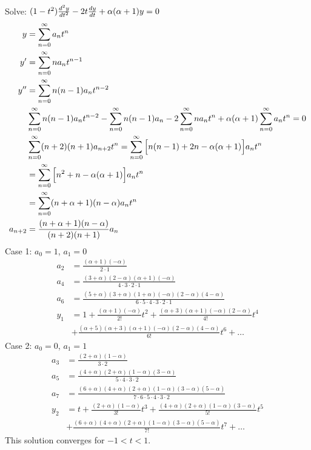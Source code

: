 \documentclass[12pt]{article}
\begin{document}
\begin{example} Solve: $(1 - t^2)\frac{d^2y}{dt^2} - 2t\frac{dy}{dt} + \alpha(\alpha + 1)y = 0 $ $$\begin{aligned} y &= \sum_{n = 0}^{\infty} a_nt^n \\ y' &= \sum_{n = 0}^{\infty} na_nt^{n - 1} \\ y'' &= \sum_{n = 0}^{\infty} n(n - 1)a_nt^{n - 2} \\ &\sum_{n = 0}^{\infty} n(n - 1)a_nt^{n - 2} - \sum_{n = 0}^{\infty} n(n - 1)a_n - 2\sum_{n = 0}^{\infty} na_nt^n + \alpha(\alpha + 1)\sum_{n = 0}^{\infty} a_nt^n = 0 \\ &\sum_{n = 0}^{\infty} (n + 2)(n + 1)a_{n + 2}t^n = \sum_{n = 0}^{\infty} \Big[ n(n - 1) + 2n - \alpha(\alpha + 1)\Big] a_nt^n \\ &= \sum_{n = 0}^{\infty} \Big[ n^2 + n - \alpha(\alpha + 1)\Big] a_nt^n \\ &= \sum_{n = 0}^{\infty} (n + \alpha + 1)(n - \alpha) a_nt^n \\ a_{n + 2} &= \frac{(n + \alpha + 1)(n - \alpha)}{(n + 2)(n  +1)}a_n \end{aligned} $$ Case 1: $a_0 = 1$, $a_1 = 0$ $$\begin{aligned} a_2 &= \frac{(\alpha + 1)(-\alpha)}{2 \cdot 1} \\ a_4 &= \frac{(3 + \alpha)(2 - \alpha)(\alpha + 1)(-\alpha)}{4 \cdot 3 \cdot 2 \cdot 1} \\ a_6 &= \frac{(5 + \alpha)(3 + \alpha)(1 + \alpha)(-\alpha)(2 - \alpha)(4 - \alpha)}{6 \cdot 5 \cdot 4 \cdot 3 \cdot 2 \cdot 1} \\ y_1 &= 1 + \frac{(\alpha + 1)(-\alpha)}{2!}t^2 + \frac{(\alpha + 3)(\alpha + 1)(-\alpha)(2 - \alpha)}{4!}t^4 \\ &+ \frac{(\alpha + 5)(\alpha + 3)(\alpha + 1)(-\alpha)(2 - \alpha)(4  - \alpha)}{6!}t^6 + \dots \end{aligned} $$ Case 2: $a_0 = 0$, $a_1 = 1$ $$\begin{aligned} a_3 &= \frac{(2 + \alpha)(1 - \alpha)}{3 \cdot 2} \\ a_5 &= \frac{(4 + \alpha)(2 + \alpha)(1 - \alpha)(3 - \alpha)}{5 \cdot 4 \cdot 3 \cdot 2} \\ a_7 &= \frac{(6 + \alpha)(4 + \alpha)(2 + \alpha)(1 - \alpha)(3 - \alpha)(5 - \alpha)}{7 \cdot 6 \cdot 5 \cdot 4 \cdot 3 \cdot 2} \\ y_2 &= t + \frac{(2 + \alpha)(1 - \alpha)}{3!}t^3 + \frac{(4 + \alpha)(2 + \alpha)(1 - \alpha)(3 - \alpha)}{5!}t^5 \\ &+ \frac{(6 + \alpha)(4 + \alpha)(2 + \alpha)(1 - \alpha)(3 - \alpha)(5 - \alpha)}{7!}t^7 + \dots \end{aligned} $$ This solution converges for $-1 < t < 1$. \end{example} 
\end{document}
